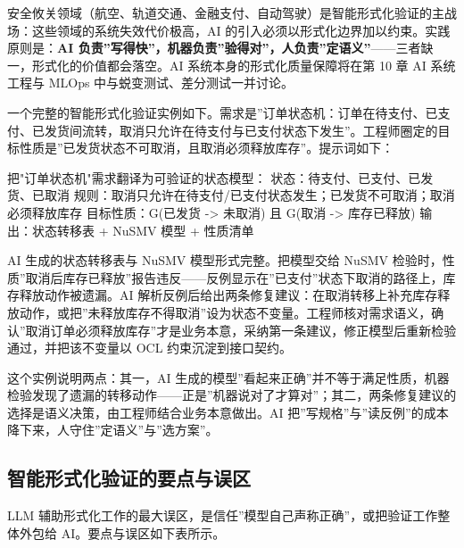 \documentclass[
]{ctexbook}
\newenvironment{Shaded}{
  \ttfamily\small
}{}
\newcommand{\NormalTok}[1]{#1}
\begin{document}
安全攸关领域（航空、轨道交通、金融支付、自动驾驶）是智能形式化验证的主战场：这些领域的系统失效代价极高，AI
的引入必须以形式化边界加以约束。实践原则是：\textbf{AI
负责''写得快''，机器负责''验得对''，人负责''定语义''}------三者缺一，形式化的价值都会落空。AI
系统本身的形式化质量保障将在第 10 章 AI 系统工程与 MLOps
中与蜕变测试、差分测试一并讨论。

一个完整的智能形式化验证实例如下。需求是''订单状态机：订单在待支付、已支付、已发货间流转，取消只允许在待支付与已支付状态下发生''。工程师圈定的目标性质是''已发货状态不可取消，且取消必须释放库存''。提示词如下：

\begin{Shaded}
\begin{Highlighting}[]
\NormalTok{把"订单状态机"需求翻译为可验证的状态模型：}
\NormalTok{状态：待支付、已支付、已发货、已取消}
\NormalTok{规则：取消只允许在待支付/已支付状态发生；已发货不可取消；取消必须释放库存}
\NormalTok{目标性质：G(已发货 {-}\textgreater{} 未取消) 且 G(取消 {-}\textgreater{} 库存已释放)}
\NormalTok{输出：状态转移表 + NuSMV 模型 + 性质清单}
\end{Highlighting}
\end{Shaded}

AI 生成的状态转移表与 NuSMV 模型形式完整。把模型交给 NuSMV
检验时，性质''取消后库存已释放''报告违反------反例显示在''已支付''状态下取消的路径上，库存释放动作被遗漏。AI
解析反例后给出两条修复建议：在取消转移上补充库存释放动作，或把''未释放库存不得取消''设为状态不变量。工程师核对需求语义，确认''取消订单必须释放库存''才是业务本意，采纳第一条建议，修正模型后重新检验通过，并把该不变量以
OCL 约束沉淀到接口契约。

这个实例说明两点：其一，AI
生成的模型''看起来正确''并不等于满足性质，机器检验发现了遗漏的转移动作------正是''机器说对了才算对''；其二，两条修复建议的选择是语义决策，由工程师结合业务本意做出。AI
把''写规格''与''读反例''的成本降下来，人守住''定语义''与''选方案''。

\subsection{智能形式化验证的要点与误区}\label{ux667aux80fdux5f62ux5f0fux5316ux9a8cux8bc1ux7684ux8981ux70b9ux4e0eux8befux533a}

LLM
辅助形式化工作的最大误区，是信任''模型自己声称正确''，或把验证工作整体外包给
AI。要点与误区如下表所示。
\end{document}
